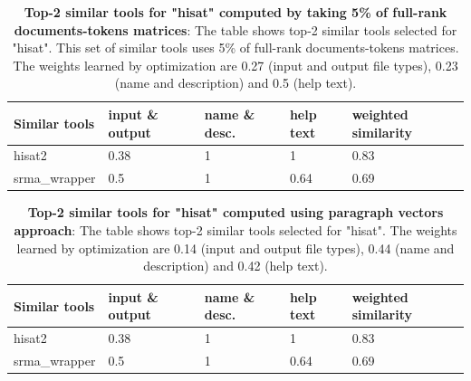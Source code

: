 \begin{table}[ht]
\begin{center}
    \begin{tabular}{|l|l|l|l|l|}
        \hline
        Similar tools   & input \& output & name \& desc. & help text & weighted similarity \\ \hline
        hisat2   & 0.38 & 1 & 1 & 0.83 \\ \hline
        srma\_wrapper & 0.5 & 1 & 0.64 & 0.69 \\ \hline
    \end{tabular}
    \end{center}
    \caption[Similar tools for hisat 5\%]{\textbf{Top-2 similar tools for "hisat" computed by taking 5\% of full-rank documents-tokens matrices}: The table shows top-2 similar tools selected for "hisat". This set of similar tools uses 5\% of full-rank documents-tokens matrices. The weights learned by optimization are 0.27 (input and output file types), 0.23 (name and description) and 0.5 (help text).}
    \label{tab:accuracy}
\end{table}

\begin{table}[ht]
\begin{center}
    \begin{tabular}{|l|l|l|l|l|}
        \hline
        Similar tools   & input \& output & name \& desc. & help text & weighted similarity \\ \hline
        hisat2   & 0.38 & 1 & 1 & 0.83 \\ \hline
        srma\_wrapper & 0.5 & 1 & 0.64 & 0.69 \\ \hline
    \end{tabular}
    \end{center}
    \caption[Similar tools for hisat paragraph vectors]{\textbf{Top-2 similar tools for "hisat" computed using paragraph vectors approach}: The table shows top-2 similar tools selected for "hisat". The weights learned by optimization are 0.14 (input and output file types), 0.44 (name and description) and 0.42 (help text).}
    \label{tab:accuracy}
\end{table}